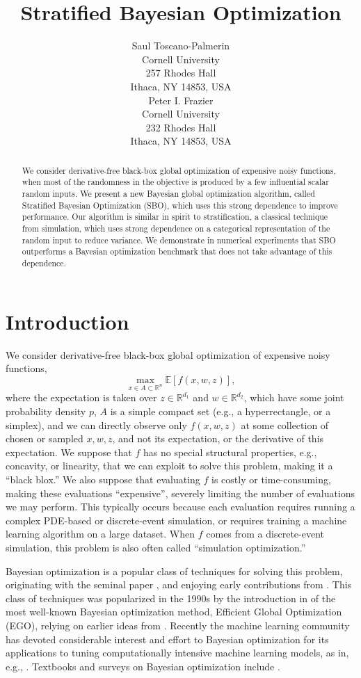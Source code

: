 \documentclass{article} %
\title{Stratified Bayesian Optimization}
\author{
	Saul Toscano-Palmerin\\[12pt]
	Cornell University \\
	257 Rhodes Hall \\
	Ithaca, NY 14853, USA\\
	\And 
    	Peter I. Frazier\\[12pt]
	Cornell University \\
	232 Rhodes Hall \\
	Ithaca, NY 14853, USA\\
}
\newcommand{\w}{w}
\newcommand{\z}{z}
\begin{document}
\maketitle

\begin{abstract}
We consider derivative-free black-box global optimization of expensive noisy functions,
when most of the randomness in the objective is produced
by a few influential scalar random inputs. We present a new Bayesian global
optimization algorithm, called Stratified Bayesian Optimization (SBO), which uses
this strong dependence to improve performance. Our algorithm is similar in spirit
to stratification, a classical technique from simulation, which uses strong
dependence on a categorical representation of the random input to reduce
variance. We demonstrate in numerical experiments that SBO outperforms a
Bayesian optimization benchmark that does not take advantage of this dependence.
\end{abstract}

\section{Introduction} 
We consider derivative-free black-box global optimization of expensive noisy functions,
\begin{equation}
\max_{x\in A\subset\mathbb{R}^{n}}\mathbb{E}\left[f\left(x,\w,\z \right)\right],
\label{eq:goal}
\end{equation}
where the expectation is taken over $\z\in\mathbb{R}^{d_1}$ and $\w\in\mathbb{R}^{d_2}$, which have some joint probability density $p$, $A$ is a simple compact set (e.g., a hyperrectangle, or a simplex), and we can directly observe only $f(x,\w,\z)$ at some collection of chosen or sampled $x,\w,\z$, and not its expectation, or the derivative of this expectation.
We suppose that $f$ has no special structural properties, e.g., concavity, or linearity, that we can exploit to solve this problem, making it a ``black blox.''
We also suppose that evaluating $f$ is costly or time-consuming, making these evaluations ``expensive'', severely limiting the number of evaluations we may perform.  This typically occurs because each evaluation requires running a complex PDE-based or discrete-event simulation, or requires training a machine learning algorithm on a large dataset.
When $f$ comes from a discrete-event simulation, this problem is also often called ``simulation optimization.''

Bayesian optimization is a popular class of techniques for solving this problem, originating with the seminal paper \cite{kushner}, and enjoying early contributions from \cite{Mockus:1978,Mockus:1989}. This class of techniques was popularized in the 1990s by the introduction in \cite{jones1998efficient} of the most well-known Bayesian optimization method, Efficient Global Optimization (EGO), relying on earlier ideas from \cite{Mockus:1989}. Recently the machine learning community has devoted considerable interest and effort to Bayesian optimization for its applications to tuning computationally intensive machine learning models, as in, e.g., \cite{snoek2012practical}. Textbooks and surveys on Bayesian optimization include \cite{forrester2008engineering,brochu2010tutorial}.
\end{document}
